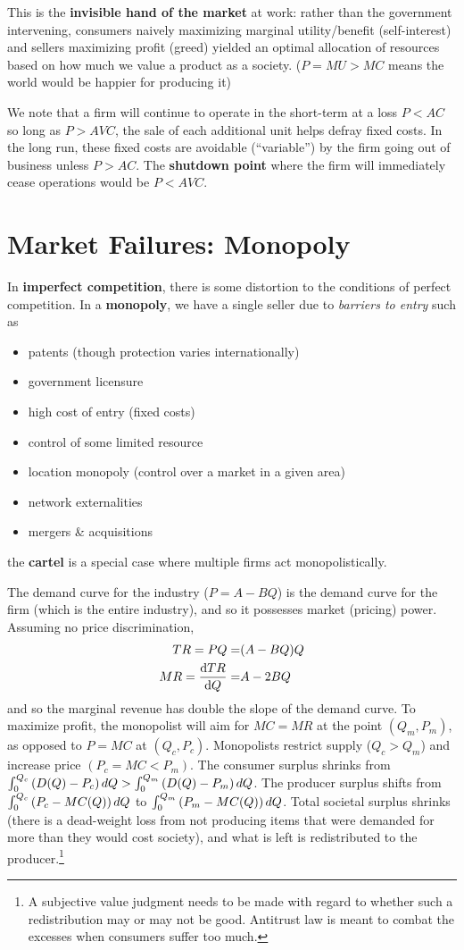 \documentclass{article}
\begin{document}
This is the \textbf{invisible hand of the market} at work: rather than the government intervening, consumers naively maximizing marginal utility/benefit (self-interest) and sellers maximizing profit (greed) yielded an optimal allocation of resources based on how much we value a product as a society. ($P=MU>MC$ means the world would be happier for producing it)

We note that a firm will continue to operate in the short-term at a loss $P<AC$ so long as $P>AVC$, the sale of each additional unit helps defray fixed costs. In the long run, these fixed costs are avoidable (``variable'') by the firm going out of business unless $P>AC$. The \textbf{shutdown point} where the firm will immediately cease operations would be $P< AVC$.

\section{Market Failures: Monopoly}
In \textbf{imperfect competition}, there is some distortion to the conditions of perfect competition. In a \textbf{monopoly}, we have a single seller due to \textit{barriers to entry} such as
\begin{itemize}
	\item patents (though protection varies internationally)
	\item government licensure
	\item high cost of entry (fixed costs)
	\item control of some limited resource
	\item location monopoly (control over a market in a given area)
	\item network externalities
	\item mergers \& acquisitions
\end{itemize}
the \textbf{cartel} is a special case where multiple firms act monopolistically.

The demand curve for the industry ($P=A-BQ$) is the demand curve for the firm (which is the entire industry), and so it possesses market (pricing) power. Assuming no price discrimination,
\begin{align*}
	TR=PQ=&(A-BQ)Q\\
	MR=\dv{TR}{Q} =& A - 2BQ
\end{align*}
and so the marginal revenue has double the slope of the demand curve. To maximize profit, the monopolist will aim for $MC=MR$ at the point $(Q_m,P_m)$, as opposed to $P=MC$ at $(Q_c,P_c)$. Monopolists restrict supply ($Q_c>Q_m$) and increase price $(P_c=MC<P_m)$. The consumer surplus shrinks from
$\int_0^{Q_c} \qty(D(Q) - P_c)\,dQ > \int_0^{Q_m} \qty(D(Q) - P_m)\,dQ$.
The producer surplus shifts from
$\int_0^{Q_c} \qty(P_c - MC(Q))\,dQ$ to $\int_0^{Q_m} \qty(P_m - MC(Q)) \,dQ$. Total societal surplus shrinks (there is a dead-weight loss from not producing items that were demanded for more than they would cost society), and what is left is redistributed to the producer.\footnote{A subjective value judgment needs to be made with regard to whether such a redistribution may or may not be good. Antitrust law is meant to combat the excesses when consumers suffer too much.}
\end{document}
